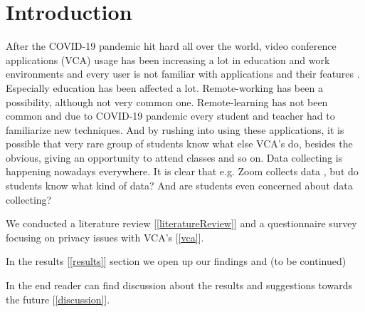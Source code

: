 \documentclass[utf8,english]{gradu3}
\begin{document}

\mainmatter


\sloppypar 



\chapter{Introduction}
\label{introduction}
After the COVID-19 pandemic hit hard all over the world, video conference applications (VCA) usage has been increasing a lot in education and work environments and every user is not familiar with applications and their features \parencite{zsolt2020}. Especially education has been affected a lot. Remote-working has been a possibility, although not very common one. Remote-learning has not been common and due to COVID-19 pandemic every student and teacher had to familiarize new techniques. And by rushing into using these applications, it is possible that very rare group of students know what else VCA's do, besides the obvious, giving an opportunity to attend classes and so on. Data collecting is happening nowadays everywhere. It is clear that e.g. Zoom collects data \parencite{zoomdata}, but do students know what kind of data? And are students even concerned about data collecting?
%

We conducted a literature review [\ref{literatureReview}] and a questionnaire survey focusing on privacy issues with VCA's [\ref{vca}]. 
%

%
In the results [\ref{results}] section we open up our findings and (to be continued)
%

%
In the end reader can find discussion about the results and suggestions towards the future [\ref{discussion}].

\end{document}
